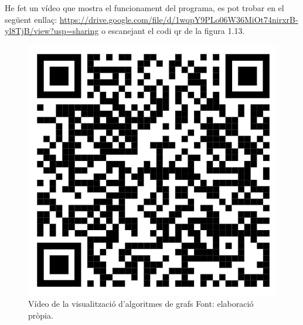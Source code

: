 He fet un vídeo que mostra el funcionament del programa, es pot trobar en el següent enllaç: \url{https://drive.google.com/file/d/1wqpY9PLo06W36MiOt74nirxrB-yl8TjB/view?usp=sharing} o escanejant el codi qr de la figura 1.13.
\begin{figure}[H]
    \centering
    \includegraphics[width=.15\textwidth]{capitols/figures/16.png}
    \caption[Vídeo de la visualització d'algoritmes de grafs.]{Vídeo de la visualització d'algoritmes de grafs Font: elaboració pròpia.}
    \label{fig:my_label}
\end{figure}
